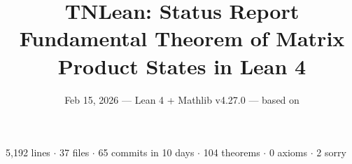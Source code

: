 \documentclass[aspectratio=169,10pt]{beamer}
\title{\textbf{TNLean: Status Report\\Fundamental Theorem of Matrix Product States in Lean 4}}
\subtitle{{\small Feb 15, 2026 --- Lean 4 + Mathlib v4.27.0 --- based on \cite{Perez-Garcia2007Matrix,Wolf2012Quantum,Evans1978Spectral}}}
\date{}
\author{}
\begin{document}

{%
\begin{frame}
    \vspace{-1.5em}
    \maketitle
    \vspace{-3em}
    \begin{center}
        {\footnotesize
            \textcolor{dimwhite}{5{,}192 lines $\cdot$
            37 files $\cdot$
            65 commits in 10 days $\cdot$
            \textcolor{leangreen}{104 theorems} $\cdot$
            \textcolor{leangreen}{0 axioms} $\cdot$
            \textcolor{amber}{2 sorry}}}
    \end{center}
\end{frame}
}
\end{document}
